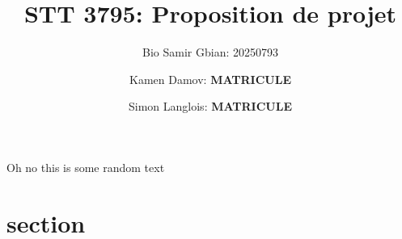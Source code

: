 \documentclass{article}
\title{STT 3795: Proposition de projet}
\author{Bio Samir Gbian: 20250793}
\author{Kamen Damov: \textbf{MATRICULE}}
\author{Simon Langlois: \textbf{MATRICULE}}
\affil{Département de mathématiques et statistiques}
\affil{Université de Montréal}
\begin{document}
\maketitle
Oh no this is some random text
\section{section}
\end{document}
